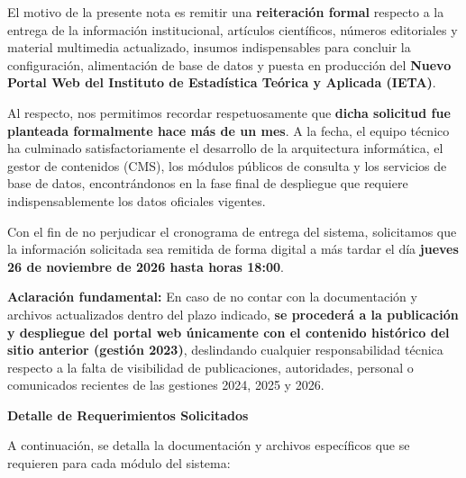 \documentclass[11pt,letterpaper]{article}
\begin{document}
El motivo de la presente nota es remitir una \textbf{reiteración formal} respecto a la entrega de la información institucional, artículos científicos, números editoriales y material multimedia actualizado, insumos indispensables para concluir la configuración, alimentación de base de datos y puesta en producción del \textbf{Nuevo Portal Web del Instituto de Estadística Teórica y Aplicada (IETA)}.

Al respecto, nos permitimos recordar respetuosamente que \textbf{dicha solicitud fue planteada formalmente hace más de un mes}. A la fecha, el equipo técnico ha culminado satisfactoriamente el desarrollo de la arquitectura informática, el gestor de contenidos (CMS), los módulos públicos de consulta y los servicios de base de datos, encontrándonos en la fase final de despliegue que requiere indispensablemente los datos oficiales vigentes.

\begin{tcolorbox}[
    enhanced,
    colback=alertBg,
    colframe=alertBorder,
    boxrule=1pt,
    arc=4pt,
    title={\textbf{\color{alertText} COMUNICADO URGENTE Y PLAZO DE ENTREGA: JUEVES 26 DE NOVIEMBRE DE 2026}},
    coltitle=alertText,
    fonttitle=\bfseries\small
]
\small \color{alertText}
Con el fin de no perjudicar el cronograma de entrega del sistema, solicitamos que la información solicitada sea remitida de forma digital a más tardar el día \textbf{jueves 26 de noviembre de 2026 hasta horas 18:00}.

\textbf{Aclaración fundamental:} En caso de no contar con la documentación y archivos actualizados dentro del plazo indicado, \textbf{se procederá a la publicación y despliegue del portal web únicamente con el contenido histórico del sitio anterior (gestión 2023)}, deslindando cualquier responsabilidad técnica respecto a la falta de visibilidad de publicaciones, autoridades, personal o comunicados recientes de las gestiones 2024, 2025 y 2026.
\end{tcolorbox}

\vspace{4pt}
\textbf{\large \color{ietaBlue}Detalle de Requerimientos Solicitados}

A continuación, se detalla la documentación y archivos específicos que se requieren para cada módulo del sistema:
\end{document}
